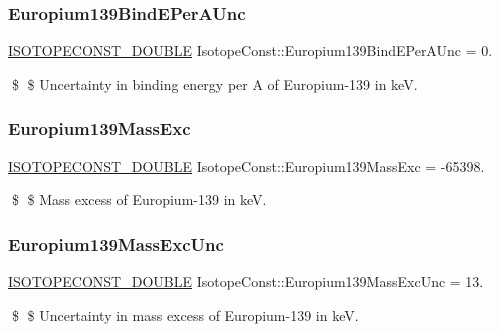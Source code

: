 \subsubsection{\texorpdfstring{Europium139\+Bind\+E\+Per\+A\+Unc}{Europium139BindEPerAUnc}}
{\footnotesize\ttfamily \mbox{\hyperlink{group___isotope_const-_macros_ga8f45a7272ce02c0b4c65c44636ed719a}{I\+S\+O\+T\+O\+P\+E\+C\+O\+N\+S\+T\+\_\+\+D\+O\+U\+B\+LE}} Isotope\+Const\+::\+Europium139\+Bind\+E\+Per\+A\+Unc = 0.}

\$ \$ Uncertainty in binding energy per A of Europium-\/139 in keV. \mbox{\label{group___isotope_const-_europium-_eu139_ga3f6f95fb35b8e7882e673db1966d6c60}} 
\subsubsection{\texorpdfstring{Europium139\+Mass\+Exc}{Europium139MassExc}}
{\footnotesize\ttfamily \mbox{\hyperlink{group___isotope_const-_macros_ga8f45a7272ce02c0b4c65c44636ed719a}{I\+S\+O\+T\+O\+P\+E\+C\+O\+N\+S\+T\+\_\+\+D\+O\+U\+B\+LE}} Isotope\+Const\+::\+Europium139\+Mass\+Exc = -\/65398.}

\$ \$ Mass excess of Europium-\/139 in keV. \mbox{\label{group___isotope_const-_europium-_eu139_ga72008ac48275c3a362d1e2b1a4644372}} 
\subsubsection{\texorpdfstring{Europium139\+Mass\+Exc\+Unc}{Europium139MassExcUnc}}
{\footnotesize\ttfamily \mbox{\hyperlink{group___isotope_const-_macros_ga8f45a7272ce02c0b4c65c44636ed719a}{I\+S\+O\+T\+O\+P\+E\+C\+O\+N\+S\+T\+\_\+\+D\+O\+U\+B\+LE}} Isotope\+Const\+::\+Europium139\+Mass\+Exc\+Unc = 13.}

\$ \$ Uncertainty in mass excess of Europium-\/139 in keV. \mbox{\label{group___isotope_const-_europium-_eu139_ga27d46a3d2b2e6ee7574260c6d6d11300}} 
